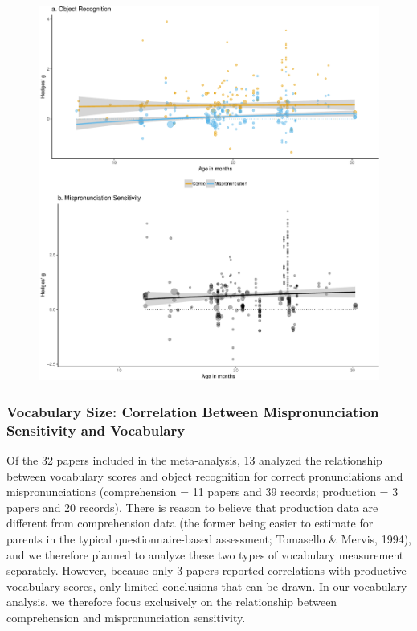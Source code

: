 \documentclass[man]{apa6}
\theoremstyle{definition}
\theoremstyle{definition}
\theoremstyle{definition}
\theoremstyle{remark}
\begin{document}
\begin{figure}
\centering
\includegraphics{Paper_Analyses_files/figure-latex/PlotMPEffect-1.pdf}
\caption{}
\end{figure}

\subsubsection{Vocabulary Size: Correlation Between Mispronunciation
Sensitivity and
Vocabulary}\label{vocabulary-size-correlation-between-mispronunciation-sensitivity-and-vocabulary}

Of the 32 papers included in the meta-analysis, 13 analyzed the
relationship between vocabulary scores and object recognition for
correct pronunciations and mispronunciations (comprehension = 11 papers
and 39 records; production = 3 papers and 20 records). There is reason
to believe that production data are different from comprehension data
(the former being easier to estimate for parents in the typical
questionnaire-based assessment; Tomasello \& Mervis, 1994), and we
therefore planned to analyze these two types of vocabulary measurement
separately. However, because only 3 papers reported correlations with
productive vocabulary scores, only limited conclusions that can be
drawn. In our vocabulary analysis, we therefore focus exclusively on the
relationship between comprehension and mispronunciation sensitivity.
\end{document}
